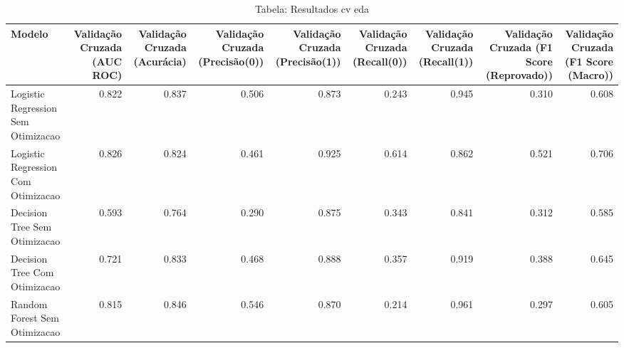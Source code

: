 \begin{table}[H] %
    \centering
    \caption{Tabela: Resultados cv eda}
    \label{tab:resultados_cv_eda}
    \renewcommand{\arraystretch}{1.25} %
    \begin{adjustwidth}{ -1in }{ -1in } %
    \centering %
    \small %
    \begin{tabular}{lrrrrrrrr}
\toprule
                            Modelo &  Validação Cruzada (AUC ROC) &  Validação Cruzada (Acurácia) &  Validação Cruzada (Precisão(0)) &  Validação Cruzada (Precisão(1)) &  Validação Cruzada (Recall(0)) &  Validação Cruzada (Recall(1)) &  Validação Cruzada (F1 Score (Reprovado)) &  Validação Cruzada (F1 Score (Macro)) \\
\midrule
Logistic Regression Sem Otimizacao &                        0.822 &                         0.837 &                            0.506 &                            0.873 &                          0.243 &                          0.945 &                                     0.310 &                                 0.608 \\
Logistic Regression Com Otimizacao &                        0.826 &                         0.824 &                            0.461 &                            0.925 &                          0.614 &                          0.862 &                                     0.521 &                                 0.706 \\
      Decision Tree Sem Otimizacao &                        0.593 &                         0.764 &                            0.290 &                            0.875 &                          0.343 &                          0.841 &                                     0.312 &                                 0.585 \\
      Decision Tree Com Otimizacao &                        0.721 &                         0.833 &                            0.468 &                            0.888 &                          0.357 &                          0.919 &                                     0.388 &                                 0.645 \\
      Random Forest Sem Otimizacao &                        0.815 &                         0.846 &                            0.546 &                            0.870 &                          0.214 &                          0.961 &                                     0.297 &                                 0.605 \\

\end{tabular}
\end{adjustwidth}
\end{table}
